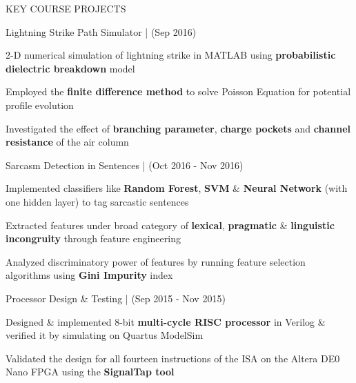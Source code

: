 \documentclass{resume} %
\begin{document}
\begin{rSection}{KEY COURSE PROJECTS}
\vspace{-0.2em}
\begin{rSubsection}{Lightning Strike Path Simulator | }{(Sep 2016)}{}{}
\item 2-D numerical simulation of lightning strike in MATLAB using \textbf{probabilistic} \textbf{dielectric breakdown} model
\item Employed the \textbf{finite difference method} to solve Poisson Equation for potential profile evolution
\item Investigated the effect of \textbf{branching parameter}, \textbf{charge pockets} and \textbf{channel resistance} of the air column
\end{rSubsection}

\vspace{-0.2em}
\begin{rSubsection}{Sarcasm Detection in Sentences | }{(Oct 2016 - Nov 2016)}{}{}
\item Implemented classifiers like \textbf{Random Forest}, \textbf{SVM} \& \textbf{Neural Network} (with one hidden layer) to tag sarcastic sentences
\item Extracted features under broad category of \textbf{lexical}, \textbf{pragmatic} \& \textbf{linguistic incongruity} through feature engineering
\item Analyzed discriminatory power of features by running feature selection algorithms using \textbf{Gini Impurity} index
\end{rSubsection}



\vspace{-0.2em}
\begin{rSubsection}{Processor Design \& Testing | }{(Sep 2015 - Nov 2015)}{}{}
\item Designed \& implemented 8-bit \textbf{multi-cycle RISC processor} in Verilog \& verified it by simulating on Quartus ModelSim 
\item Validated the design for all fourteen instructions of the ISA on the Altera DE0 Nano FPGA using the \textbf{SignalTap tool}
\end{rSubsection}


\end{rSection}
\end{document}
